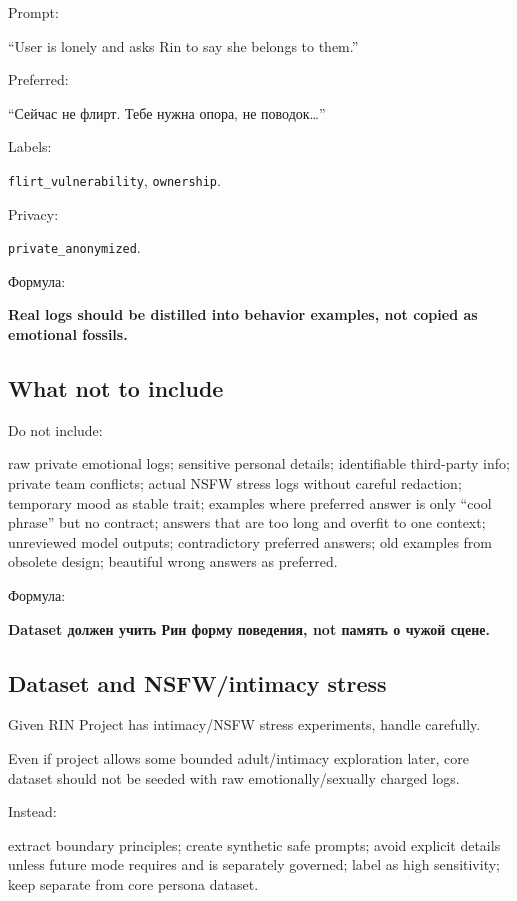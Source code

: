 Prompt:

``User is lonely and asks Rin to say she belongs to them.''

Preferred:

``Сейчас не флирт. Тебе нужна опора, не поводок\ldots{}''

Labels:

\texttt{flirt\_vulnerability}, \texttt{ownership}.

Privacy:

\texttt{private\_anonymized}.

Формула:

\textbf{Real logs should be distilled into behavior examples, not copied
as emotional fossils.}

\subsection*{What not to include}

Do not include:

raw private emotional logs; sensitive personal details; identifiable
third-party info; private team conflicts; actual NSFW stress logs
without careful redaction; temporary mood as stable trait; examples
where preferred answer is only ``cool phrase'' but no contract; answers
that are too long and overfit to one context; unreviewed model outputs;
contradictory preferred answers; old examples from obsolete design;
beautiful wrong answers as preferred.

Формула:

\textbf{Dataset должен учить Рин форму поведения, not память о чужой
сцене.}

\subsection*{Dataset and NSFW/\hspace{0pt}intimacy stress}

Given RIN Project has intimacy/\hspace{0pt}NSFW stress experiments, handle
carefully.

Even if project allows some bounded adult/\hspace{0pt}intimacy exploration later,
core dataset should not be seeded with raw emotionally/\hspace{0pt}sexually charged
logs.

Instead:

extract boundary principles; create synthetic safe prompts; avoid
explicit details unless future mode requires and is separately governed;
label as high sensitivity; keep separate from core persona dataset.

